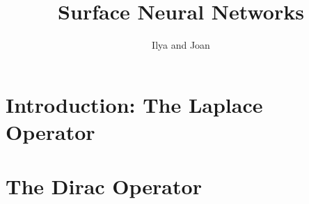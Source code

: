 \documentclass[11pt]{amsart}
\title{Surface Neural Networks}
\author{Ilya and Joan}
\begin{document}
\maketitle

\section{Introduction: The Laplace Operator}

\section{The Dirac Operator}
\end{document}
